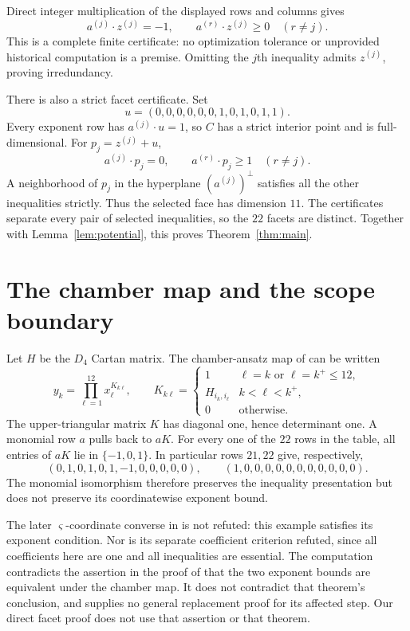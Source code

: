 \documentclass[11pt]{article}
\begin{document}
\endgroup
Direct integer multiplication of the displayed rows and columns gives
\begin{equation}\label{eq:cert}
 a^{(j)}\cdot z^{(j)}=-1,\qquad
 a^{(r)}\cdot z^{(j)}\ge0\quad(r\ne j).
\end{equation}
This is a complete finite certificate: no optimization tolerance or
unprovided historical computation is a premise. Omitting the $j$th
inequality admits $z^{(j)}$, proving irredundancy.

There is also a strict facet certificate. Set
\[
 u=(0,0,0,0,0,0,1,0,1,0,1,1).
\]
Every exponent row has $a^{(j)}\cdot u=1$, so $C$ has a strict interior
point and is full-dimensional. For $p_j=z^{(j)}+u$,
\[
 a^{(j)}\cdot p_j=0,\qquad a^{(r)}\cdot p_j\ge1\quad(r\ne j).
\]
A neighborhood of $p_j$ in the hyperplane $(a^{(j)})^\perp$ satisfies all the
other inequalities strictly. Thus the selected face has dimension $11$.
The certificates separate every pair of selected inequalities, so the
$22$ facets are distinct. Together with Lemma~\ref{lem:potential}, this
proves Theorem~\ref{thm:main}.

\section{The chamber map and the scope boundary}
Let $H$ be the $D_4$ Cartan matrix. The chamber-ansatz map of
\cite[Def.~9]{KS} can be written
\[
 y_k=\prod_{\ell=1}^{12}x_\ell^{K_{k\ell}},\qquad
 K_{k\ell}=
 \begin{cases}
 1&\ell=k\text{ or }\ell=k^+\le12,\\
 H_{i_k,i_\ell}&k<\ell<k^+,\\
 0&\text{otherwise}.
 \end{cases}
\]
The upper-triangular matrix $K$ has diagonal one, hence determinant one.
A monomial row $a$ pulls back to $aK$. For every one of the $22$ rows in the
table, all entries of $aK$ lie in $\{-1,0,1\}$. In particular rows $21,22$
give, respectively,
\[
 (0,1,0,1,0,1,-1,0,0,0,0,0),\qquad
 (1,0,0,0,0,0,0,0,0,0,0,0).
\]
The monomial isomorphism therefore preserves the inequality presentation
but does not preserve its coordinatewise exponent bound.

The later $\varsigma$-coordinate converse in \cite[Conj.~3]{KS} is not
refuted: this example satisfies its exponent condition. Nor is its separate
coefficient criterion refuted, since all coefficients here are one and
all inequalities are essential. The computation contradicts the assertion
in the proof of \cite[Thm.~2, p.~1046]{KS} that the two exponent bounds are
equivalent under the chamber map. It does not contradict that theorem's
conclusion, and supplies no general replacement proof for its affected step.
Our direct facet proof does not use that assertion or that theorem.
\end{document}
